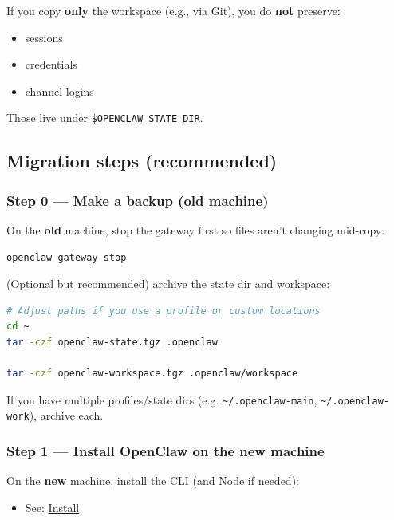 If you copy \textbf{only} the workspace (e.g., via Git), you do \textbf{not} preserve:

\begin{itemize}
  \item sessions
  \item credentials
  \item channel logins
\end{itemize}


Those live under \texttt{\$OPENCLAW\_STATE\_DIR}.

\subsection{Migration steps (recommended)}


\subsubsection{Step 0 — Make a backup (old machine)}


On the \textbf{old} machine, stop the gateway first so files aren’t changing mid-copy:

\begin{lstlisting}[language=bash]
openclaw gateway stop
\end{lstlisting}


(Optional but recommended) archive the state dir and workspace:

\begin{lstlisting}[language=bash]
# Adjust paths if you use a profile or custom locations
cd ~
tar -czf openclaw-state.tgz .openclaw

tar -czf openclaw-workspace.tgz .openclaw/workspace
\end{lstlisting}


If you have multiple profiles/state dirs (e.g. \texttt{\textasciitilde{}/.openclaw-main}, \texttt{\textasciitilde{}/.openclaw-work}), archive each.

\subsubsection{Step 1 — Install OpenClaw on the new machine}


On the \textbf{new} machine, install the CLI (and Node if needed):

\begin{itemize}
  \item See: \href{/install}{Install}
\end{itemize}


